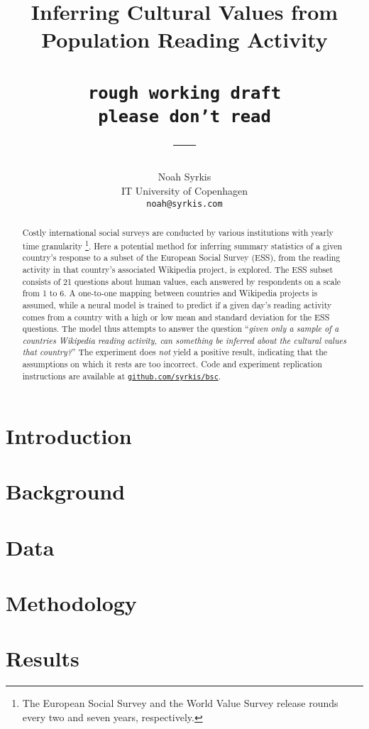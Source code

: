 \documentclass[11pt]{article}
\title{Inferring Cultural Values from Population Reading Activity\\ \texttt{\\rough working draft}\texttt{\\please don't read\\}—}
\author{Noah Syrkis \\
  IT University of Copenhagen \\
  \texttt{noah@syrkis.com} \\}
\begin{document}
\maketitle
\begin{abstract}
    Costly international social surveys are conducted by various institutions with yearly time granularity
    \footnote{The European Social Survey and the World Value Survey release rounds every two and seven years, respectively.}.
    Here a potential method for inferring summary statistics of a given country's response to a subset of the European Social Survey (ESS), from the reading activity in that country's associated Wikipedia project, is explored.
    The ESS subset consists of 21 questions about human values, each answered by respondents on a scale from 1 to 6.
    A one-to-one mapping between countries and Wikipedia projects is assumed, while a neural model is trained to predict if a given day's reading activity comes from a country with a high or low mean and standard deviation for the ESS questions.
    The model thus attempts to answer the question ``\emph{given only a sample of a countries Wikipedia reading activity, can something be inferred about the cultural values that country?}''
    The experiment does \emph{not} yield a positive result, indicating that the assumptions on which it rests are too incorrect.
    Code and experiment replication instructions are available at
    \href{https://github.com/syrkis/bsc}{\texttt{github.com/syrkis/bsc}}.
\end{abstract}

\section{Introduction}


\section{Background}


\section{Data}


\section{Methodology}


\section{Results}

\end{document}
